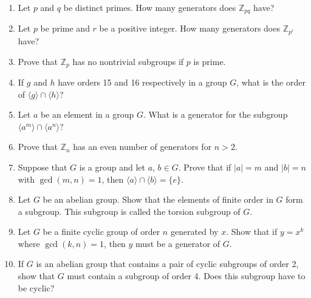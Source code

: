 {\begin{enumerate}
\begin{enumerate}
 \item
The order of $a$ is the same as the order of $a^{-1}$.
 
 \item
For all $g \in G$, $|a| = |g^{-1}ag|$.
 
 \item
The order of $ab$ is the same as the order of $ba$.
 
\end{enumerate}
 
 
\item
Let $p$ and $q$ be distinct primes.  How many generators does ${\mathbb
Z}_{pq}$ have? 
 
 
\item
Let $p$ be prime and $r$ be a positive integer.  How many generators
does ${\mathbb Z}_{p^r}$ have? 
 
 
\item
Prove that  ${\mathbb Z}_{p}$ has no nontrivial subgroups if $p$ is
prime. 
 
 
\item
If $g$ and $h$ have orders 15 and 16 respectively in a group $G$, what
is the order of $\langle g \rangle  \cap \langle h \rangle $? 
 
 
\item
Let $a$ be an element in a group $G$. What is a generator for the
subgroup $\langle a^m \rangle  \cap  \langle a^n \rangle $?
 
 
\item
Prove that ${\mathbb Z}_n$ has an even number of generators for $n>2$. 
 
 
\item
Suppose that $G$ is a group and let $a$, $b \in G$. Prove that if $|a|
= m$ and $|b| = n$ with $\gcd(m,n) = 1$, then $\langle a \rangle  \cap
\langle b \rangle  = \{ e \}$. 
 
 
\item
Let $G$ be an abelian group. Show that the elements of finite order in
$G$ form a subgroup. This subgroup is called the {\bfi torsion
subgroup} of $G$. 
 
 
\item
Let $G$ be a finite cyclic group of order $n$ generated by $x$. Show
that if $y = x^k$ where $\gcd(k,n) = 1$, then $y$ must be a generator
of $G$.
 
 
\item
If $G$ is an abelian group that contains a pair of cyclic subgroups of
order 2, show that $G$ must contain a subgroup of order 4. Does this
subgroup have to be cyclic?
 

\end{enumerate}}
